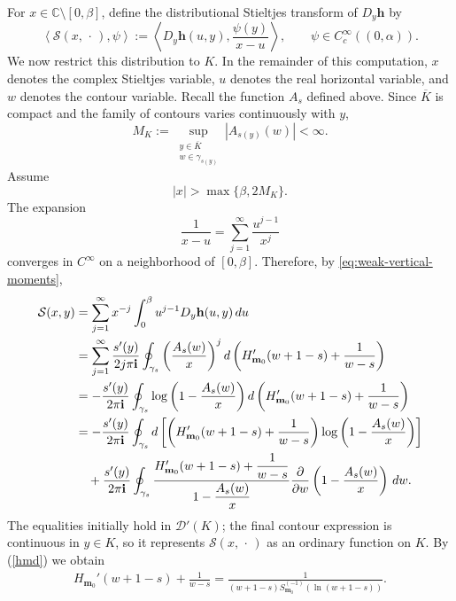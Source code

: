 \documentclass[11pt]{amsart}
\theoremstyle{plain}
\newcommand\bm{\mathbf{m}}
\numberwithin{equation}{section}
\numberwithin{theorem}{section}
\numberwithin{figure}{section}
\begin{document}
For $x\in\mathbb C\setminus[0,\beta]$, define the distributional
Stieltjes transform of $D_y\mathbf h$ by
\begin{equation}
    \left\langle
        \mathcal S(x,\,\cdot\,),\psi
    \right\rangle
    :=
    \left\langle
        D_y\mathbf h(u,y),
        \frac{\psi(y)}{x-u}
    \right\rangle,
    \qquad
    \psi\in C_c^\infty((0,\alpha)).
    \label{eq:distributional-stieltjes-transform}
\end{equation}
We now restrict this distribution to $K$. In the remainder of this
computation, $x$ denotes the complex Stieltjes variable, $u$ denotes the
real horizontal variable, and $w$ denotes the contour variable. Recall
the function $A_s$ defined above. Since $\overline K$ is compact and the
family of contours varies continuously with $y$,
\[
    M_K
    :=
    \sup_{\substack{y\in\overline K\\ w\in\gamma_{s(y)}}}
    |A_{s(y)}(w)|
    <\infty.
\]
Assume
\[
    |x|>\max\{\beta,2M_K\}.
\]
The expansion
\[
    \frac{1}{x-u}
    =
    \sum_{j=1}^{\infty}\frac{u^{j-1}}{x^j}
\]
converges in $C^\infty$ on a neighborhood of $[0,\beta]$. Therefore,
by \eqref{eq:weak-vertical-moments},
\begin{align}
\mathcal S(x,y)
&=
\sum_{j=1}^{\infty}x^{-j}
\int_0^\beta u^{j-1}D_y\mathbf h(u,y)\,du
\label{stx}\\
&=
\sum_{j=1}^{\infty}
\frac{s'(y)}{2j\pi\mathbf i}
\oint_{\gamma_s}
\left(\frac{A_s(w)}{x}\right)^j
 d\left(
 H_{\mathbf m_0}'(w+1-s)
 +\frac{1}{w-s}
\right)
\notag\\
&=
-\frac{s'(y)}{2\pi\mathbf i}
\oint_{\gamma_s}
\log\left(1-\frac{A_s(w)}{x}\right)
 d\left(
 H_{\mathbf m_0}'(w+1-s)
 +\frac{1}{w-s}
\right)
\notag\\
&=
-\frac{s'(y)}{2\pi\mathbf i}
\oint_{\gamma_s}
 d\left[
 \left(
 H_{\mathbf m_0}'(w+1-s)
 +\frac{1}{w-s}
 \right)
 \log\left(1-\frac{A_s(w)}{x}\right)
 \right]
\notag\\
&\quad+
\frac{s'(y)}{2\pi\mathbf i}
\oint_{\gamma_s}
\frac{
 H_{\mathbf m_0}'(w+1-s)+\dfrac{1}{w-s}
}{
 1-\dfrac{A_s(w)}{x}
}
\frac{\partial}{\partial w}
\left(1-\frac{A_s(w)}{x}\right)
\,dw.
\notag
\end{align}
The equalities initially hold in $\mathcal D'(K)$; the final contour
expression is continuous in $y\in K$, so it represents
$\mathcal S(x,\,\cdot\,)$ as an ordinary function on $K$.
By (\ref{hmd}) we obtain
\begin{eqnarray}
H_{\mathbf{m}_0}'(w+1-s)+\frac{1}{w-s}=\frac{1}{(w+1-s) S_{\bm_0}^{(-1)}(\ln (w+1-s))}.\label{hpe}
\end{eqnarray}
\end{document}

